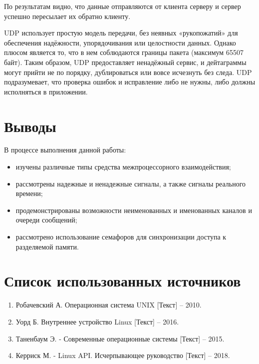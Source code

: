 

По результатам видно, что данные отправляются от клиента серверу и сервер успешно пересылает их обратно клиенту.

UDP использует простую модель передачи, без неявных «рукопожатий» для обеспечения надёжности, упорядочивания или целостности данных. Однако плюсом является то, что в нем соблюдаются границы пакета (максимум 65507 байт). Таким образом, UDP предоставляет ненадёжный сервис, и дейтаграммы могут прийти не по порядку, дублироваться или вовсе исчезнуть без следа. UDP подразумевает, что проверка ошибок и исправление либо не нужны, либо должны исполняться в приложении.

\section{Выводы}

В процессе выполнения данной работы:

\begin{itemize}
	\item изучены различные типы средства межпроцессорного взаимодействия;
	\item рассмотрены надежные и ненадежные сигналы, а также сигналы реального времени;
	\item продемонстрированы возможности неименованных и именованных каналов и очереди сообщений;
	\item рассмотрено использование семафоров для синхронизации доступа к разделяемой памяти.
\end{itemize}

\section*{Список использованных источников}

\begin{enumerate}
	\item Робачевский А. Операционная система UNIX [Текст] -- 2010.
	\item Уорд Б. Внутреннее устройство Linux [Текст] -- 2016.
	\item Таненбаум Э. - Современные операционные системы [Текст] -- 2015.
	\item Керриск М. - Linux API. Исчерпывающее руководство [Текст] -- 2018.
\end{enumerate}	


